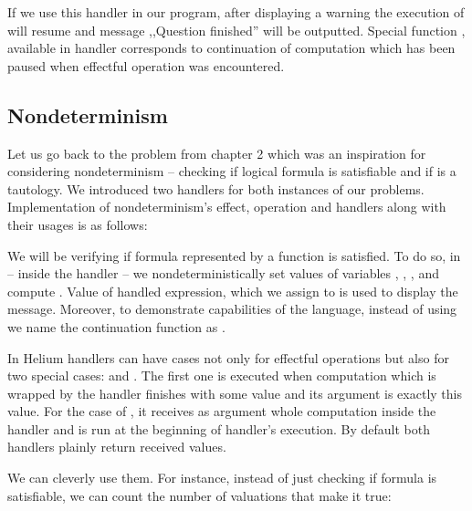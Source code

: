 If we use this handler in our program, after displaying a warning the execution of  will resume and message ,,Question finished'' will be outputted. Special function , available in handler corresponds to continuation of computation which has been paused when effectful operation was encountered.

\subsection{Nondeterminism}

Let us go back to the problem from chapter 2 which was an inspiration for considering nondeterminism -- checking if logical formula is satisfiable and if is a tautology. We introduced two handlers for both instances of our problems. Implementation of nondeterminism's effect, operation  and handlers along with their usages is as follows:


\pagebreak


We will be verifying if formula represented by a function  is satisfied. To do so, in  -- inside the handler -- we nondeterministically set values of variables , , , and compute . Value of handled expression, which we assign to  is used to display the message. Moreover, to demonstrate capabilities of the language, instead of using  we name the continuation function as .

In Helium handlers can have cases not only for effectful operations but also for two special cases:  and . The first one is executed when computation which is wrapped by the handler finishes with some value and its argument is exactly this value. For the case of , it receives as argument whole computation inside the handler and is run at the beginning of handler's execution. By default both handlers plainly return received values.



We can cleverly use them. For instance, instead of just checking if formula is satisfiable, we can count the number of valuations that make it true:

